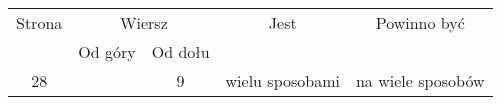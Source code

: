 \documentclass[a4paper,11pt]{article}
\numberwithin{equation}{section}
\begin{document}
\label{sec:Feller-Wstep-do-rachunku-ETC}




\begin{center}

  \begin{tabular}{|c|c|c|c|c|}
    \hline
    Strona & \multicolumn{2}{c|}{Wiersz} & Jest
                              & Powinno być \\ \cline{2-3}
    & Od góry & Od dołu & & \\
    \hline
    28  & &  9 & wielu sposobami & na wiele sposobów \\
    \hline
  \end{tabular}

\end{center}

\VerSpaceSix
















{}






\end{document}
